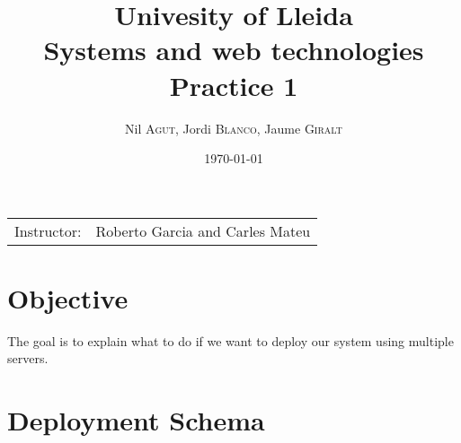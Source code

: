 \documentclass{article}
\title{Univesity of Lleida \\ Systems and web technologies \\ Practice 1} %
\author{Nil \textsc{Agut}, Jordi \textsc{Blanco}, Jaume \textsc{Giralt}} %
\date{\today} %
\begin{document}
\maketitle %

\begin{center}
\begin{tabular}{l r}
Instructor: & Roberto Garcia and Carles Mateu  %
\end{tabular}
\end{center}



\section{Objective}
The goal is to explain what to do if we want to deploy our system using multiple servers. 

\section{Deployment Schema}
\end{document}
